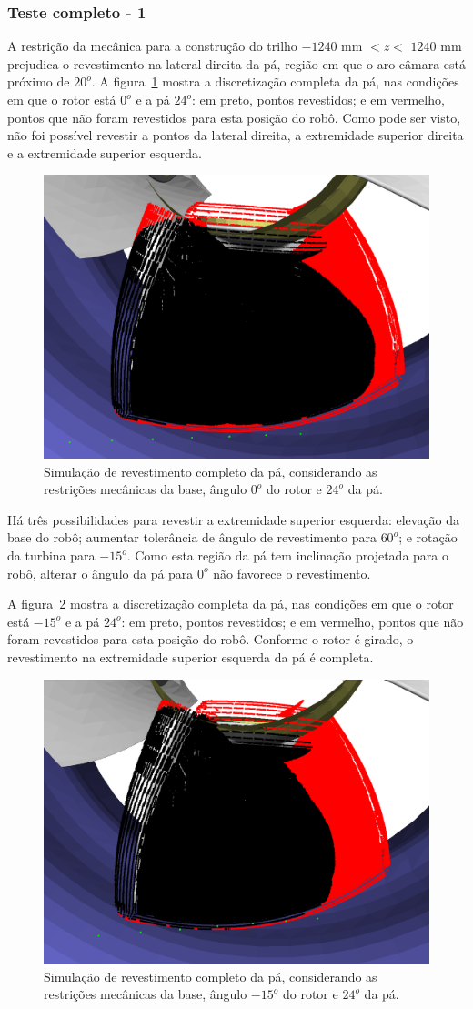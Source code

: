 \subsubsection{Teste completo - 1 }\label{teste1}

A restrição da mecânica para a construção do trilho $-1240$ mm $< z <$ $1240$ mm
prejudica o revestimento na lateral direita da pá, região em que o aro câmara
está próximo de $20^o$. A figura~\ref{fig::simcomp1_1} mostra a
discretização completa da pá, nas condições em que o rotor está $0^o$ e a pá
$24^o$:
em preto, pontos revestidos; e em vermelho, pontos que não foram revestidos para
esta posição do robô. Como pode ser visto, não foi possível revestir a pontos da
lateral direita, a extremidade superior direita e a extremidade superior
esquerda.

\begin{figure}[!ht]
	\centering	
	\includegraphics[width=.5\columnwidth]{figs/simcomp1_1.png}
	\caption{Simulação de revestimento completo da pá, considerando as
	restrições mecânicas da base, ângulo $0^o$ do rotor e $24^o$ da pá.}
	\label{fig::simcomp1_1}
\end{figure}

Há três possibilidades para revestir a extremidade superior esquerda: elevação
da base do robô; aumentar tolerância de ângulo de revestimento para $60^o$; e
rotação da turbina para $-15^o$. Como esta região da pá tem inclinação projetada
para o robô, alterar o ângulo da pá para $0^o$ não favorece o revestimento.

A figura~\ref{fig::simcomp1_5} mostra a discretização completa da pá, nas
condições em que o rotor está $-15^o$ e a pá $24^o$: em preto, pontos
revestidos; e em vermelho, pontos que não foram revestidos para esta posição do
robô. Conforme o rotor é girado, o revestimento na extremidade superior esquerda
da pá é completa.

\begin{figure}[!ht]
	\centering	
	\includegraphics[width=.5\columnwidth]{figs/simcomp1_5.png}
	\caption{Simulação de revestimento completo da pá, considerando as
	restrições mecânicas da base, ângulo $-15^o$ do rotor e $24^o$ da pá.}
	\label{fig::simcomp1_5}
\end{figure}

